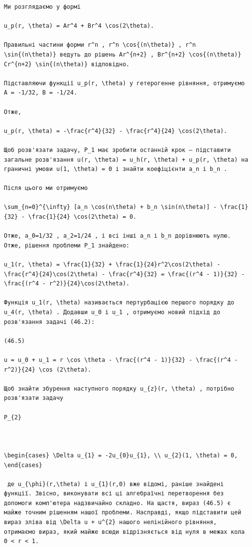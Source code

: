 \documentclass[
  ukrainian,
]{article}
\begin{document}
\begin{verbatim}
Ми розглядаємо у формі

u_p(r, \theta) = Ar^4 + Br^4 \cos(2\theta).

Правильні частини форми r^n , r^n \cos{(n\theta)} , r^n \sin{(n\theta)} ведуть до рішень Ar^{n+2} , Br^{n+2} \cos{(n\theta)} Cr^{n+2} \sin{(n\theta)} відповідно.

Підставляючи функції u_p(r, \theta) у гетерогенне рівняння, отримуємо A = -1/32, B = -1/24.

Отже,

u_p(r, \theta) = -\frac{r^4}{32} - \frac{r^4}{24} \cos(2\theta).

Щоб розв'язати задачу, P_1 має зробити останній крок — підставити загальне розв'язання u(r, \theta) = u_h(r, \theta) + u_p(r, \theta) на граничні умови u(1, \theta) = 0 і знайти коефіцієнти a_n і b_n .

Після цього ми отримуємо

\sum_{n=0}^{\infty} [a_n \cos(n\theta) + b_n \sin(n\theta)] - \frac{1}{32} - \frac{1}{24} \cos(2\theta) = 0.

Отже, a_0=1/32 , a_2=1/24 , і всі інші a_n і b_n дорівнюють нулю. Отже, рішення проблеми P_1 знайдено:

u_1(r, \theta) = \frac{1}{32} + \frac{1}{24}r^2\cos(2\theta) - \frac{r^4}{24}\cos(2\theta) - \frac{r^4}{32} = \frac{(r^4 - 1)}{32} - \frac{(r^4 - r^2)}{24}\cos(2\theta).

Функція u_1(r, \theta) називається пертурбацією першого порядку до u_4(r, \theta) . Додавши u_0 і u_1 , отримуємо новий підхід до розв'язання задачі (46.2):

(46.5)

u = u_0 + u_1 = r \cos \theta - \frac{(r^4 - 1)}{32} - \frac{(r^4 - r^2)}{24} \cos (2\theta).

Щоб знайти збурення наступного порядку u_{z}(r, \theta) , потрібно розв'язати задачу

P_{2}

 

\begin{cases} \Delta u_{1} = -2u_{0}u_{1}, \\ u_{2}(1, \theta) = 0, \end{cases}

 де u_{\phi}(r,\theta) і u_{1}(r,0) вже відомі, раніше знайдені функції. Звісно, виконувати всі ці алгебраїчні перетворення без допомоги комп'ютера надзвичайно складно. На щастя, вираз (46.5) є майже точним рішенням нашої проблеми. Насправді, якщо підставити цей вираз зліва від \Delta u + u^{2} нашого нелінійного рівняння, отримаємо вираз, який майже всюди відрізняється від нуля в межах кола 0 < r < 1.


\end{verbatim}
\end{document}
